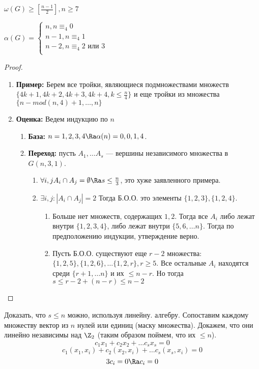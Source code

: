 \begin{problem}
    \(\omega(G) \ge \left[\frac{n - 1}{2}\right], n \ge 7\)
\end{problem}

\begin{theorem}
    \(\alpha(G) = \left\{\begin{array}{l}
        n, n \equiv_4 0 \\
        n - 1, n \equiv_4 1 \\
        n - 2, n \equiv_4 2 \text{ или } 3 \\
    \end{array}\right.\)
\end{theorem}
\begin{proof}\indent
    \begin{enumerate}
        \item[] \textbf{Пример:}
        Берем все тройки, являющиеся подмножествами множеств \(\{4k + 1, 4k + 2, 4k + 3, 4k + 4, k \le \frac{n}{4}\}\) и еще тройки из множества \(\{n - mod(n, 4) + 1, \dots,  n\}\)
        \item[] \textbf{Оценка:} 
        Ведем индукцию по \(n\)
        \begin{enumerate}
            \item[] \textbf{База:} \(n = 1, 2, 3, 4 \Ra \alpha(n) = 0, 0, 1, 4\).
            \item[] \textbf{Переход:} пусть \(A_1, \dots A_s\) --- вершины независимого множества в \(G(n, 3, 1)\).
            \begin{enumerate}
                \item \(\forall i, j A_i \cap A_j = \emptyset \Ra s \le \frac{n}{3}\), это хуже заявленного примера.
                \item \(\exists i, j: |A_i \cap A_j| = 2\)
                Тогда Б.О.О. это элементы \(\{1, 2, 3\}, \{1, 2, 4\}\).
                \begin{enumerate}
                    \item Больше нет множеств, содержащих \(1, 2\). Тогда все \(A_i\) либо лежат внутри \(\{1, 2, 3, 4\}\), либо лежат внутри \(\{5, 6, \dots n\}\). Тогда по предположению индукции, утверждение верно.
                    \item Пусть Б.О.О. существуют еще \(r - 2\) множества: \(\{1, 2, 5\}, \{1, 2, 6\}, \dots \{1, 2, r\}, r \ge 5\). Все остальные \(A_i\) находятся среди \(\{r + 1, \dots n\}\) и их \(\le n - r\). Но тогда \(s \le r - 2 + (n - r) \le n - 2\)
                \end{enumerate}
            \end{enumerate}
        \end{enumerate}
    \end{enumerate}
\end{proof}
\begin{note}
    Доказать, что \(s \le n\) можно, используя линейну. алгебру. Сопоставим каждому множеству вектор из \(n\) нулей или единиц (маску множества). Докажем, что они линейно независимы над \(\Z_2\) (таким образом поймем, что их \(\le n\)).
    \[c_1x_1 + c_2x_2 + \dots c_sx_s = 0\]
    \[c_1(x_1, x_i) + c_2(x_2, x_i) + \dots c_s(x_s, x_i) = 0\]
    \[3c_i = 0 \Ra c_i = 0\]
\end{note}

